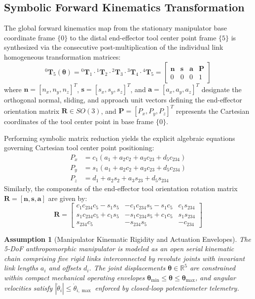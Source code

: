 \documentclass[journal]{IEEEtran}
\newtheorem{assumption}{Assumption}
\begin{document}
\subsection{Symbolic Forward Kinematics Transformation}
The global forward kinematics map from the stationary manipulator base coordinate frame $\{0\}$ to the distal end-effector tool center point frame $\{5\}$ is synthesized via the consecutive post-multiplication of the individual link homogeneous transformation matrices:
\begin{equation}
{}^0\mathbf{T}_5(\boldsymbol{\theta}) = {}^0\mathbf{T}_1 \cdot {}^1\mathbf{T}_2 \cdot {}^2\mathbf{T}_3 \cdot {}^3\mathbf{T}_4 \cdot {}^4\mathbf{T}_5 = \begin{bmatrix}
\mathbf{n} & \mathbf{s} & \mathbf{a} & \mathbf{P} \\
0 & 0 & 0 & 1
\end{bmatrix}
\end{equation}
where $\mathbf{n} = [n_x, n_y, n_z]^T$, $\mathbf{s} = [s_x, s_y, s_z]^T$, and $\mathbf{a} = [a_x, a_y, a_z]^T$ designate the orthogonal normal, sliding, and approach unit vectors defining the end-effector orientation matrix $\mathbf{R} \in SO(3)$, and $\mathbf{P} = [P_x, P_y, P_z]^T$ represents the Cartesian coordinates of the tool center point in base frame $\{0\}$.

Performing symbolic matrix reduction yields the explicit algebraic equations governing Cartesian tool center point positioning:
\begin{align}
P_x &= c_1 \left( a_1 + a_2 c_2 + a_3 c_{23} + d_5 c_{234} \right) \\
P_y &= s_1 \left( a_1 + a_2 c_2 + a_3 c_{23} + d_5 c_{234} \right) \\
P_z &= d_1 + a_2 s_2 + a_3 s_{23} + d_5 s_{234}
\end{align}
Similarly, the components of the end-effector tool orientation rotation matrix $\mathbf{R} = [\mathbf{n}, \mathbf{s}, \mathbf{a}]$ are given by:
\begin{equation}
\mathbf{R} = \begin{bmatrix}
c_1 c_{234} c_5 - s_1 s_5 & -c_1 c_{234} s_5 - s_1 c_5 & c_1 s_{234} \\
s_1 c_{234} c_5 + c_1 s_5 & -s_1 c_{234} s_5 + c_1 c_5 & s_1 s_{234} \\
s_{234} c_5 & -s_{234} s_5 & -c_{234}
\end{bmatrix}
\end{equation}

\begin{assumption}[Manipulator Kinematic Rigidity and Actuation Envelopes]
\label{ass_rigidity}
The 5-DoF anthropomorphic manipulator is modeled as an open serial kinematic chain comprising five rigid links interconnected by revolute joints with invariant link lengths $a_i$ and offsets $d_i$. The joint displacements $\boldsymbol{\theta} \in \mathbb{R}^5$ are constrained within compact mechanical operating envelopes $\boldsymbol{\theta}_{\min} \le \boldsymbol{\theta} \le \boldsymbol{\theta}_{\max}$, and angular velocities satisfy $|\dot{\theta}_i| \le \dot{\theta}_{i,\max}$ enforced by closed-loop potentiometer telemetry.
\end{assumption}
\end{document}
